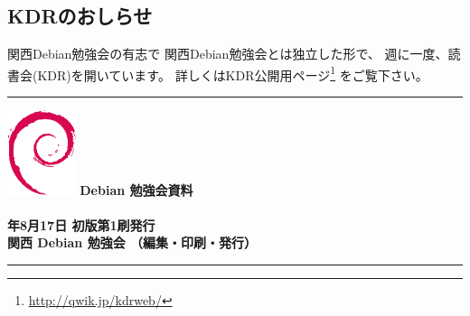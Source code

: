 \documentclass[mingoth,a4paper]{jsarticle}
\newcommand{\debmtgyear}{2008}
\newcommand{\debmtgdate}{17}
\newcommand{\debmtgmonth}{8}
\begin{document}
\subsection{KDRのおしらせ}
関西Debian勉強会の有志で
関西Debian勉強会とは独立した形で、
週に一度、読書会(KDR)を開いています。
詳しくはKDR公開用ページ\footnote{\url{http://qwik.jp/kdrweb/}}
をご覧下さい。


\mbox{}\newpage

\printindex
 \cleartooddpage

 \begin{minipage}[b]{0.2\hsize}
 \end{minipage}
 \begin{minipage}[b]{0.8\hsize}

 \vspace*{15cm}
 \rule{\hsize}{1mm}
 \vspace{2mm}
 \includegraphics[width=2cm]{image200502/openlogo-nd.eps}
 \noindent \Large \bf Debian 勉強会資料\\ \\
 \noindent \normalfont \debmtgyear{}年\debmtgmonth{}月\debmtgdate{}日 \hspace{5mm}  初版第1刷発行\\
 \noindent \normalfont 関西 Debian 勉強会 （編集・印刷・発行）\\
 \rule{\hsize}{1mm}
 \end{minipage}
\end{document}
